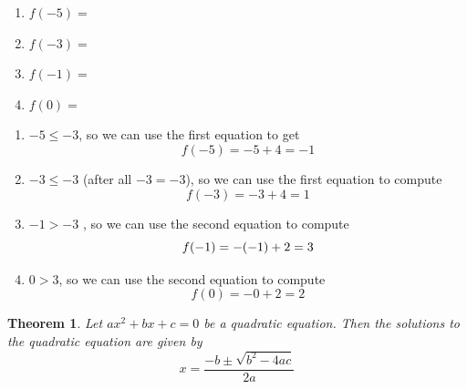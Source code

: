 \documentclass[addpoints,12pt]{exam}
\newtheorem{theorem}{Theorem}
\begin{document}
\begin{questions}
\begin{enumerate}[label = \alph*)]
    \item $f(-5)=$
		\item $f(-3) = $
		\item $f(-1)= $
		\item $f(0)=$
\end{enumerate}

\begin{solution}
    \begin{enumerate}
        \item $-5 \leq -3$, so we can use the first equation to get \[
        f(-5) = -5 +4 = -1 
        \]
			\item $-3 \leq -3$ (after all $-3 = -3$), so we can use the first equation to compute \[f(-3)= -3+4 =1 \]
			\item $-1 > -3 $ , so we can use the second equation to compute 
				\[
				f(-1) = -(-1)+2 = 3 \\
				\]
		\item $0>3$, so we can use the second equation to compute \[f(0) = -0+2 = 2 \]
    \end{enumerate}
\end{solution}

\end{questions}

\begin{theorem}
    Let $ax^{2}+bx +c =0$ be a quadratic equation. Then the solutions to the quadratic equation are given by 
		\[
			x = \frac{-b \pm \sqrt{b^{2} - 4ac}}{2a}
		\]
\end{theorem}
\end{document}
